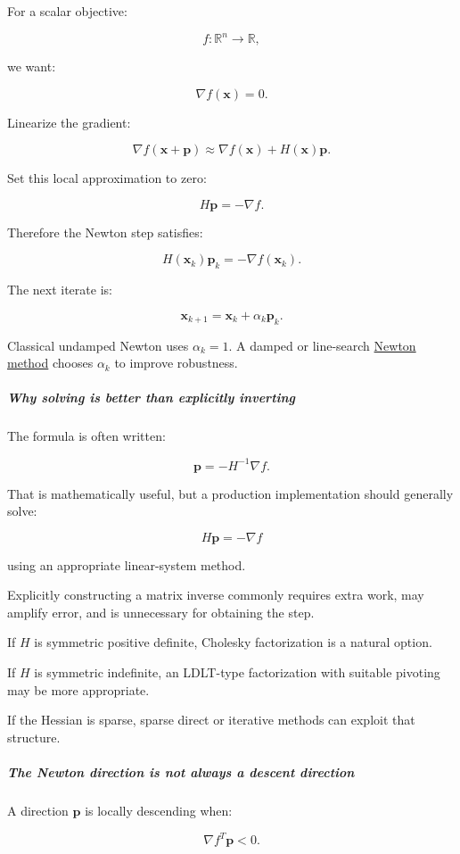 For a scalar objective:

\[
f:\mathbb R^n\to\mathbb R,
\]

we want:

\[
\nabla f(\mathbf x)=0.
\]

Linearize the gradient:

\[
\nabla f(\mathbf x+\mathbf p) \approx \nabla f(\mathbf x)+H(\mathbf x)\mathbf p.
\]

Set this local approximation to zero:

\[
H\mathbf p=-\nabla f.
\]

Therefore the Newton step satisfies:

\[
\boxed{ H(\mathbf x_k)\mathbf p_k=-\nabla f(\mathbf x_k) }.
\]

The next iterate is:

\[
\mathbf x_{k+1}=\mathbf x_k+\alpha_k\mathbf p_k.
\]

Classical undamped Newton uses \(\alpha_k=1\). A damped or line-search \hyperref[02-foundations-ii-ch026]{Newton method} chooses \(\alpha_k\) to improve robustness.

\subparagraph{Why solving is better than explicitly inverting}\label{why-solving-is-better-than-explicitly-inverting}

The formula is often written:

\[
\mathbf p=-H^{-1}\nabla f.
\]

That is mathematically useful, but a production implementation should generally solve:

\[
H\mathbf p=-\nabla f
\]

using an appropriate linear-system method.

Explicitly constructing a matrix inverse commonly requires extra work, may amplify error, and is unnecessary for obtaining the step.

If \(H\) is symmetric positive definite, Cholesky factorization is a natural option.

If \(H\) is symmetric indefinite, an LDLT-type factorization with suitable pivoting may be more appropriate.

If the Hessian is sparse, sparse direct or iterative methods can exploit that structure.

\subparagraph{The Newton direction is not always a descent direction}\label{the-newton-direction-is-not-always-a-descent-direction}

A direction \(\mathbf p\) is locally descending when:

\[
\nabla f^T\mathbf p<0.
\]

